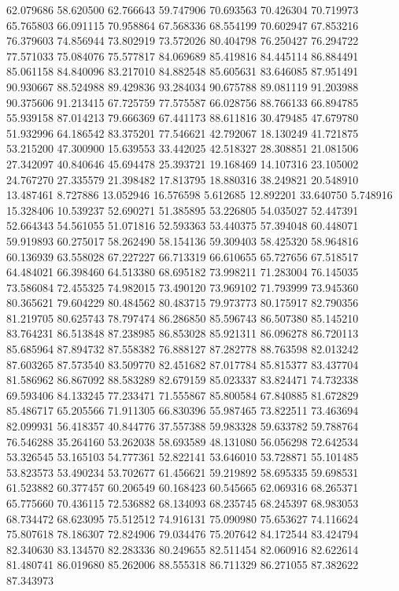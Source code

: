 62.079686
58.620500
62.766643
59.747906
70.693563
70.426304
70.719973
65.765803
66.091115
70.958864
67.568336
68.554199
70.602947
67.853216
76.379603
74.856944
73.802919
73.572026
80.404798
76.250427
76.294722
77.571033
75.084076
75.577817
84.069689
85.419816
84.445114
86.884491
85.061158
84.840096
83.217010
84.882548
85.605631
83.646085
87.951491
90.930667
88.524988
89.429836
93.284034
90.675788
89.081119
91.203988
90.375606
91.213415
67.725759
77.575587
66.028756
88.766133
66.894785
55.939158
87.014213
79.666369
67.441173
88.611816
30.479485
47.679780
51.932996
64.186542
83.375201
77.546621
42.792067
18.130249
41.721875
53.215200
47.300900
15.639553
33.442025
42.518327
28.308851
21.081506
27.342097
40.840646
45.694478
25.393721
19.168469
14.107316
23.105002
24.767270
27.335579
21.398482
17.813795
18.880316
38.249821
20.548910
13.487461
8.727886
13.052946
16.576598
5.612685
12.892201
33.640750
5.748916
15.328406
10.539237
52.690271
51.385895
53.226805
54.035027
52.447391
52.664343
54.561055
51.071816
52.593363
53.440375
57.394048
60.448071
59.919893
60.275017
58.262490
58.154136
59.309403
58.425320
58.964816
60.136939
63.558028
67.227227
66.713319
66.610655
65.727656
67.518517
64.484021
66.398460
64.513380
68.695182
73.998211
71.283004
76.145035
73.586084
72.455325
74.982015
73.490120
73.969102
71.793999
73.945360
80.365621
79.604229
80.484562
80.483715
79.973773
80.175917
82.790356
81.219705
80.625743
78.797474
86.286850
85.596743
86.507380
85.145210
83.764231
86.513848
87.238985
86.853028
85.921311
86.096278
86.720113
85.685964
87.894732
87.558382
76.888127
87.282778
88.763598
82.013242
87.603265
87.573540
83.509770
82.451682
87.017784
85.815377
83.437704
81.586962
86.867092
88.583289
82.679159
85.023337
83.824471
74.732338
69.593406
84.133245
77.233471
71.555867
85.800584
67.840885
81.672829
85.486717
65.205566
71.911305
66.830396
55.987465
73.822511
73.463694
82.099931
56.418357
40.844776
37.557388
59.983328
59.633782
59.788764
76.546288
35.264160
53.262038
58.693589
48.131080
56.056298
72.642534
53.326545
53.165103
54.777361
52.822141
53.646010
53.728871
55.101485
53.823573
53.490234
53.702677
61.456621
59.219892
58.695335
59.698531
61.523882
60.377457
60.206549
60.168423
60.545665
62.069316
68.265371
65.775660
70.436115
72.536882
68.134093
68.235745
68.245397
68.983053
68.734472
68.623095
75.512512
74.916131
75.090980
75.653627
74.116624
75.807618
78.186307
72.824906
79.034476
75.207642
84.172544
83.424794
82.340630
83.134570
82.283336
80.249655
82.511454
82.060916
82.622614
81.480741
86.019680
85.262006
88.555318
86.711329
86.271055
87.382622
87.343973
